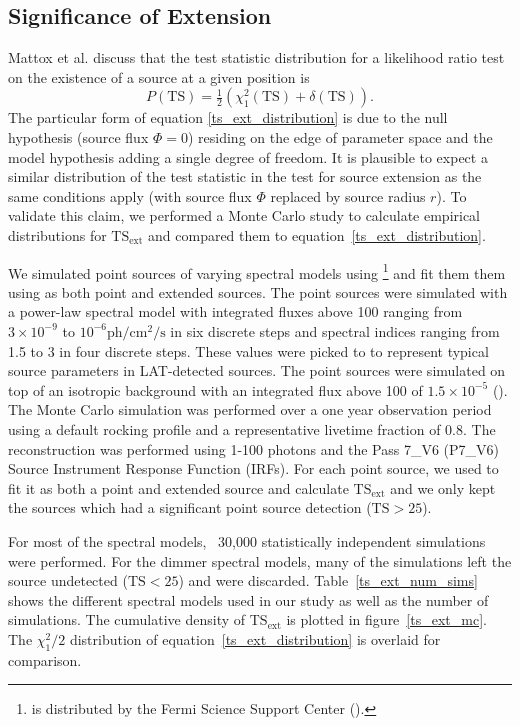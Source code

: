 \documentclass[12pt,preprint]{aastex}
\newcommand{\mev}{\text{MeV}\xspace}
\newcommand{\gev}{\text{GeV}\xspace}
\newcommand{\ph}{\text{ph}\xspace}
\newcommand{\cm}{\text{cm}\xspace}
\renewcommand{\sec}{\text{s}\xspace}
\newcommand{\tsext}{{\ensuremath{\text{TS}_{\text{ext}}}}\xspace}
\newcommand{\ts}{\text{TS}\xspace}
\newcommand{\pointlike}{\text{\em pointlike}\xspace}
\newcommand{\gtobssim}{\text{\em gtobssim}\xspace}
\begin{document}
\subsection{Significance of Extension}
\label{monte_carlo_validation}

Mattox et al. discuss that the test statistic distribution
for a likelihood ratio test on the existence of a source at
a given position is \cite{mattox_egret}
\begin{equation}\label{ts_ext_distribution}
  P(\ts)=\tfrac{1}{2}(\chi^2_1(\ts)+\delta(\ts)).
\end{equation}
The particular form of equation \ref{ts_ext_distribution} is
due to the null hypothesis (source flux $\Phi=0$) residing
on the edge of parameter space and the model hypothesis
adding a single degree of freedom. It is plausible to
expect a similar distribution of the test statistic
in the test for source extension as the same conditions
apply (with source flux $\Phi$ replaced by source radius $r$).
To validate this claim, we performed a Monte Carlo
study to calculate empirical distributions for $\tsext$ and
compared them to equation~\ref{ts_ext_distribution}.

We simulated point sources of varying spectral models using
\gtobssim\footnote{\gtobssim is distributed
by the Fermi Science Support Center (\cite{fssc}).}
and fit them
them using \pointlike as both point and extended sources. 
The point sources were simulated with a power-law spectral model 
with integrated fluxes above 100 \mev ranging from
$3\times 10^{-9}$ to $10^{-6} \ph/\cm^2/\sec$ in
six discrete steps and spectral
indices ranging from 1.5 to 3 in four discrete steps.
These values were picked to
to represent typical source parameters in LAT-detected sources. The point
sources were simulated on top of an isotropic 
background with an integrated flux above 100 \mev of $1.5\times10^{-5}$
(\cite{sreekumar_isotropic}).  The Monte Carlo simulation was
performed over a one year observation period
using a default rocking profile
and a representative livetime fraction of 0.8.  The reconstruction was
performed using 1-100 \gev photons 
and the 
Pass 7\_V6 (P7\_V6) Source Instrument
Response Function (IRFs).  For each point source, we used \pointlike
to fit it as both a point and extended source and calculate \tsext and
we only kept the sources which had a significant point source detection
($\ts>25$).


For most of the spectral models, ~30,000 statistically independent
simulations were performed. For the dimmer spectral models, many of the
simulations left the source undetected ($\ts<25$)
and were discarded.  Table~\ref{ts_ext_num_sims}
shows the different spectral models used in our study as well as the
number of simulations.  The cumulative density of \tsext is plotted in
figure~\ref{ts_ext_mc}. The $\chi^2_1/2$ distribution of
equation~\ref{ts_ext_distribution} is overlaid for comparison.
\end{document}
